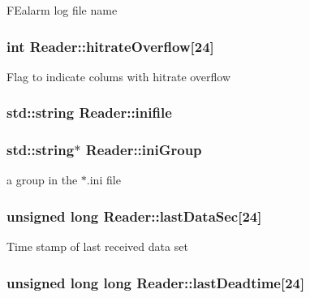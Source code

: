 F\-Ealarm log file name \hypertarget{classReader_a19a9f80856c30d86a31b79f1672b3804}{
\subsubsection[{hitrate\-Overflow}]{\setlength{\rightskip}{0pt plus 5cm}int Reader\-::hitrate\-Overflow\mbox{[}24\mbox{]}\hspace{0.3cm}{\ttfamily [private]}}}\label{classReader_a19a9f80856c30d86a31b79f1672b3804}
Flag to indicate colums with hitrate overflow \hypertarget{classReader_aaeaf0ff38217063a14b00bf16deed50a}{
\subsubsection[{inifile}]{\setlength{\rightskip}{0pt plus 5cm}std\-::string Reader\-::inifile\hspace{0.3cm}{\ttfamily [private]}}}\label{classReader_aaeaf0ff38217063a14b00bf16deed50a}
\hypertarget{classReader_ab53774f0eac672c5d80f5f086e7b0d3b}{
\subsubsection[{ini\-Group}]{\setlength{\rightskip}{0pt plus 5cm}std\-::string$\ast$ Reader\-::ini\-Group\hspace{0.3cm}{\ttfamily [private]}}}\label{classReader_ab53774f0eac672c5d80f5f086e7b0d3b}
a group in the $\ast$.ini file \hypertarget{classReader_a14d16a29a867041a4bc916142630a162}{
\subsubsection[{last\-Data\-Sec}]{\setlength{\rightskip}{0pt plus 5cm}unsigned long Reader\-::last\-Data\-Sec\mbox{[}24\mbox{]}\hspace{0.3cm}{\ttfamily [private]}}}\label{classReader_a14d16a29a867041a4bc916142630a162}
Time stamp of last received data set \hypertarget{classReader_ad7344b65bf38e5ea1a22230ad37fc95a}{
\subsubsection[{last\-Deadtime}]{\setlength{\rightskip}{0pt plus 5cm}unsigned long long Reader\-::last\-Deadtime\mbox{[}24\mbox{]}\hspace{0.3cm}{\ttfamily [private]}}}\label{classReader_ad7344b65bf38e5ea1a22230ad37fc95a}

